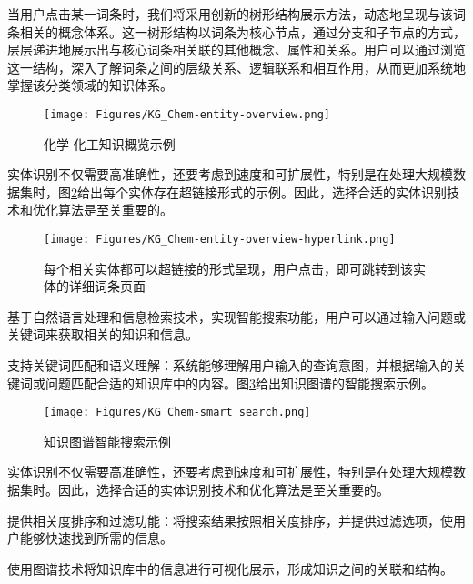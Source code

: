 当用户点击某一词条时，我们将采用创新的树形结构展示方法，动态地呈现与该词条相关的概念体系。这一树形结构以词条为核心节点，通过分支和子节点的方式，层层递进地展示出与核心词条相关联的其他概念、属性和关系。用户可以通过浏览这一结构，深入了解词条之间的层级关系、逻辑联系和相互作用，从而更加系统地掌握该分类领域的知识体系。

\begin{figure}[h!]
\centering
\texttt{[image: Figures/KG\_Chem-entity-overview.png]}
\caption{\small\textrm{化学-化工知识概览示例}}%
\label{Fig:KG-Chem_entity_overview}
\end{figure}
实体识别不仅需要高准确性，还要考虑到速度和可扩展性，特别是在处理大规模数据集时，图\ref{Fig:KG-Chem_entity_overview-hyperlink}给出每个实体存在超链接形式的示例。因此，选择合适的实体识别技术和优化算法是至关重要的。

\begin{figure}[h!]
\centering
\texttt{[image: Figures/KG\_Chem-entity-overview-hyperlink.png]}
\caption{\small\textrm{每个相关实体都可以超链接的形式呈现，用户点击，即可跳转到该实体的详细词条页面}}%
\label{Fig:KG-Chem_entity_overview-hyperlink}
\end{figure}

基于自然语言处理和信息检索技术，实现智能搜索功能，用户可以通过输入问题或关键词来获取相关的知识和信息。

支持关键词匹配和语义理解：系统能够理解用户输入的查询意图，并根据输入的关键词或问题匹配合适的知识库中的内容。图\ref{Fig:KG-Chem_smart_search}给出知识图谱的智能搜索示例。
\begin{figure}[h!]
\centering
\texttt{[image: Figures/KG\_Chem-smart\_search.png]}
\caption{\small\textrm{知识图谱智能搜索示例}}%
\label{Fig:KG-Chem_smart_search}
\end{figure}
实体识别不仅需要高准确性，还要考虑到速度和可扩展性，特别是在处理大规模数据集时。因此，选择合适的实体识别技术和优化算法是至关重要的。

提供相关度排序和过滤功能：将搜索结果按照相关度排序，并提供过滤选项，使用户能够快速找到所需的信息。

使用图谱技术将知识库中的信息进行可视化展示，形成知识之间的关联和结构。

